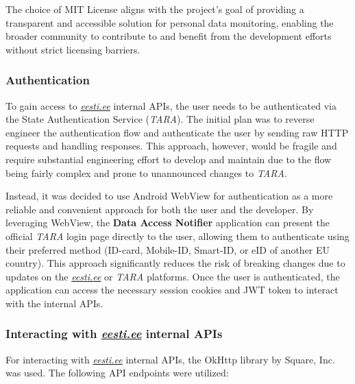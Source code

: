 The choice of MIT License aligns with the project's goal of providing a transparent and accessible solution for personal data monitoring, enabling the broader community to contribute to and benefit from the development efforts without strict licensing barriers.

\subsubsection{Authentication}
To gain access to \textit{\href{https://www.eesti.ee}{eesti.ee}} internal APIs, the user needs to be authenticated via the State Authentication Service (\textit{TARA}). The initial plan was to reverse engineer the authentication flow and authenticate the user by sending raw HTTP requests and handling responses. This approach, however, would be fragile and require substantial engineering effort to develop and maintain due to the flow being fairly complex and prone to unannounced changes to \textit{TARA}.

Instead, it was decided to use Android WebView for authentication as a more reliable and convenient approach for both the user and the developer. By leveraging WebView, the \textbf{Data Access Notifier} application can present the official \textit{TARA} login page directly to the user, allowing them to authenticate using their preferred method (ID-card, Mobile-ID, Smart-ID, or eID of another EU country). This approach significantly reduces the risk of breaking changes due to updates on the \textit{\href{https://www.eesti.ee}{eesti.ee}} or \textit{TARA} platforms. Once the user is authenticated, the application can access the necessary session cookies and JWT token to interact with the internal APIs.

\subsubsection{Interacting with \textit{\href{https://www.eesti.ee}{eesti.ee}} internal APIs}
For interacting with \textit{\href{https://www.eesti.ee}{eesti.ee}} internal APIs, the OkHttp library by Square, Inc.\cite{okhttp-library} was used. The following API endpoints were utilized:

